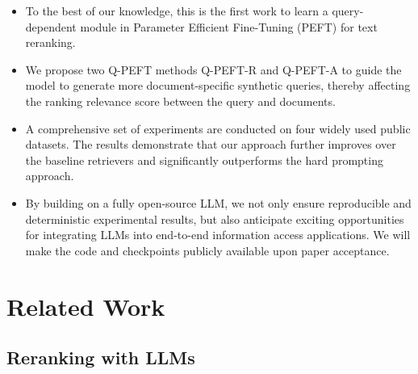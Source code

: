 \documentclass[sigconf,natbib=true,anonymous=false]{acmart}
\begin{document}
\begin{itemize}

\item To the best of our knowledge, this is the first work to learn a query-dependent module in Parameter Efficient Fine-Tuning (PEFT) for text reranking.

\item We propose two Q-PEFT methods Q-PEFT-R and Q-PEFT-A to guide the model to generate more document-specific synthetic queries, thereby affecting the ranking relevance score between the query and documents.

\item A comprehensive set of experiments are conducted on four widely used public datasets. The results demonstrate that our approach further improves over the baseline retrievers and significantly outperforms the hard prompting approach.

\item By building on a fully open-source LLM, we not only ensure reproducible and deterministic experimental results, but also anticipate exciting opportunities for integrating LLMs into end-to-end information access applications. We will make the code and checkpoints publicly available upon paper acceptance.

\end{itemize}



\section{Related Work}
\subsection{Reranking with LLMs}
\end{document}
